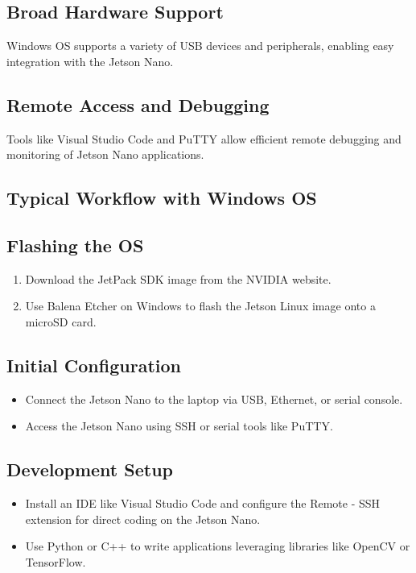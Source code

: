 \subsection*{Broad Hardware Support}
Windows OS supports a variety of USB devices and peripherals, enabling easy integration with the Jetson Nano.

\subsection*{Remote Access and Debugging}
Tools like Visual Studio Code and PuTTY allow efficient remote debugging and monitoring of Jetson Nano applications.

\subsection{Typical Workflow with Windows OS}
\subsection*{Flashing the OS}
\begin{enumerate}
	\item Download the JetPack SDK image from the NVIDIA website.
	\item Use Balena Etcher on Windows to flash the Jetson Linux image onto a microSD card.
\end{enumerate}

\subsection*{Initial Configuration}
\begin{itemize}
	\item Connect the Jetson Nano to the laptop via USB, Ethernet, or serial console.
	\item Access the Jetson Nano using SSH or serial tools like PuTTY.
\end{itemize}

\subsection*{Development Setup}
\begin{itemize}
	\item Install an IDE like Visual Studio Code and configure the Remote - SSH extension for direct coding on the Jetson Nano.
	\item Use Python or C++ to write applications leveraging libraries like OpenCV or TensorFlow.
\end{itemize}

